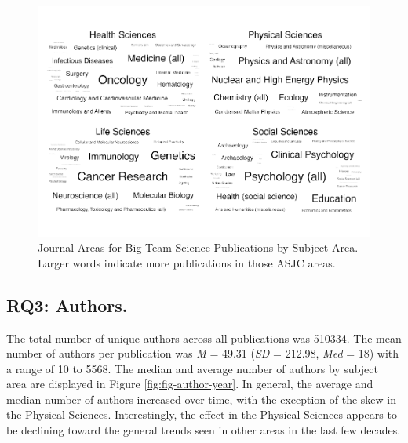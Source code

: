 \documentclass[
  man,floatsintext]{apa6}
\begin{document}
\begin{figure}
\centering
\includegraphics{manuscript_scopus_files/figure-latex/fig-clouds-1.pdf}
\caption{\label{fig:fig-clouds}Journal Areas for Big-Team Science Publications by Subject Area. Larger words indicate more publications in those ASJC areas.}
\end{figure}

\hypertarget{rq3-authors.}{%
\subsection{RQ3: Authors.}\label{rq3-authors.}}

The total number of unique authors across all publications was
510334. The mean number of authors per publication was \emph{M} =
49.31 (\emph{SD} = 212.98, \emph{Med} = 18) with a
range of 10 to 5568. The median and average
number of authors by subject area are displayed in Figure
\ref{fig:fig-author-year}. In general, the average and median number of
authors increased over time, with the exception of the skew in the
Physical Sciences. Interestingly, the effect in the Physical Sciences
appears to be declining toward the general trends seen in other areas in
the last few decades.
\end{document}
